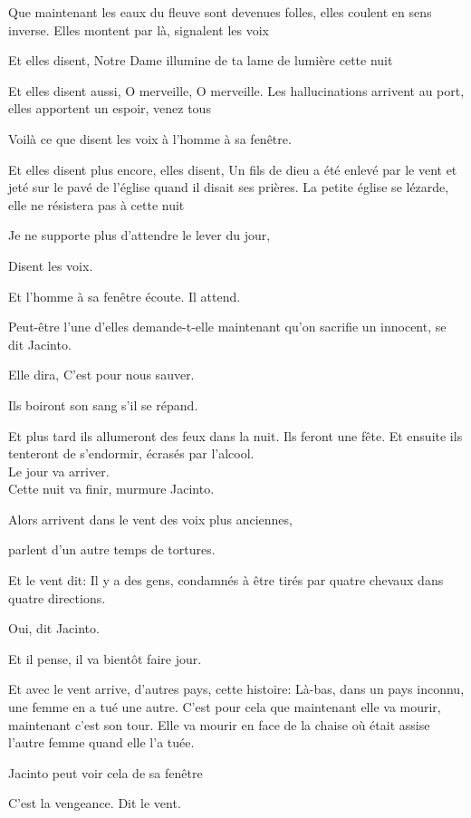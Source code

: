 Que maintenant les eaux du fleuve sont devenues folles, elles coulent en
sens inverse. Elles montent par là, signalent les voix

Et elles disent, Notre Dame illumine de ta lame de lumière cette nuit

Et elles disent aussi, O merveille, O merveille. Les hallucinations
arrivent au port, elles apportent un espoir, venez tous

Voilà ce que disent les voix à l'homme à sa fenêtre.

Et elles disent plus encore, elles disent, Un fils de dieu a été enlevé
par le vent et jeté sur le pavé de l'église quand il disait ses prières.
La petite église se lézarde, elle ne résistera pas à cette nuit

Je ne supporte plus d'attendre le lever du jour,

Disent les voix.

Et l'homme à sa fenêtre écoute. Il attend.

Peut-être l'une d'elles demande-t-elle maintenant qu'on sacrifie un
innocent, se dit Jacinto.

Elle dira, C'est pour nous sauver.

Ils boiront son sang s'il se répand.

Et plus tard ils allumeront des feux dans la nuit. Ils feront une fête.
Et ensuite ils tenteront de s'endormir, écrasés par l'alcool.\\

Le jour va arriver.\\

Cette nuit va finir, murmure Jacinto.

Alors arrivent dans le vent des voix plus anciennes,

parlent d'un autre temps de tortures.

Et le vent dit: Il y a des gens, condamnés à être tirés par quatre
chevaux dans quatre directions.

Oui, dit Jacinto.

Et il pense, il va bientôt faire jour.

Et avec le vent arrive, d'autres pays, cette histoire: Là-bas, dans un
pays inconnu, une femme en a tué une autre. C'est pour cela que
maintenant elle va mourir, maintenant c'est son tour. Elle va mourir en
face de la chaise où était assise l'autre femme quand elle l'a tuée.

Jacinto peut voir cela de sa fenêtre

C'est la vengeance. Dit le vent.

